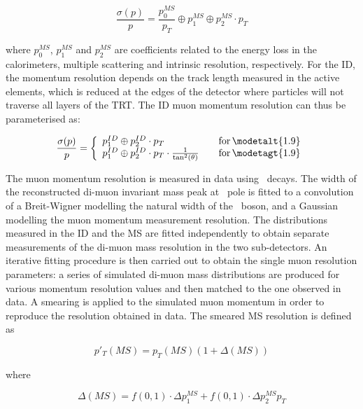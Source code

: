 \begin{equation}
\frac{ \sigma (p) }{ p } = \frac{ p_{0}^{MS} }{ p_{T} } \oplus  p_{1}^{MS}
\oplus  p_{2}^{MS} \cdot p_{T}
\end{equation}

where  $p_{0}^{MS}$, $p_{1}^{MS}$ and $p_{2}^{MS}$ are coefficients related to
the energy loss in the calorimeters, multiple scattering and intrinsic
resolution, respectively. For the ID, the momentum resolution depends on the track length
measured in the active elements, which is reduced at the edges of the
detector where particles will not traverse all layers of the TRT. The ID muon momentum resolution can thus be parameterised as:

\begin{equation}
\frac{ \sigma (p) }{ p } = \left\{
    \begin{array}{l l}
        p_{1}^{ID} \oplus  p_{2}^{ID} \cdot p_{T}  & \quad {\rm
for}\, \modetalt{1.9} \\
    p_{1}^{ID} \oplus  p_{2}^{ID} \cdot p_{T} \cdot
\frac{1}{\tan ^{2} (\theta)}  & \quad {\rm for}\, \modetagt{1.9} \\
  \end{array} \right.
\end{equation}

The muon momentum resolution is measured in data using \Zmm\ decays. The width
of the reconstructed di-muon invariant mass peak at \Z\ pole is fitted to a
convolution of a Breit-Wigner modelling the natural width of the \Z\ boson, and
a Gaussian modelling the muon momentum measurement resolution. The
distributions measured in the ID and the MS are fitted independently to obtain
separate measurements of the di-muon mass resolution in the two sub-detectors.
An iterative fitting procedure is then carried out to obtain the single muon
resolution parameters: a series of simulated di-muon mass distributions are produced for
various momentum resolution values and then matched to the one observed in data. 
A smearing is applied to the simulated muon momentum in order to reproduce the
resolution obtained in data. The smeared MS resolution is defined as

\begin{equation}
p'_{T}(MS) = p_{T}(MS) (1+\Delta(MS))
\end{equation}

 where 

\begin{equation}
\Delta(MS) = f(0,1) \cdot \Delta p_{1}^{MS} +  f(0,1) \cdot \Delta p_{2}^{MS} p_{T}
\end{equation}

